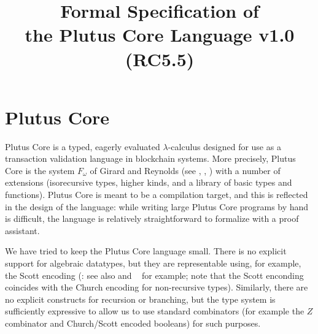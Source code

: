 \documentclass[a4paper]{article}
\begin{document}
%
\title{Formal Specification of\\the Plutus Core Language v1.0 (RC5.5)}


\maketitle

\thispagestyle{plain}
\pagestyle{plain}



\section{Plutus Core}

Plutus Core is a typed, eagerly evaluated $\lambda$-calculus designed
for use as a transaction validation language in blockchain
systems. More precisely, Plutus Core is the system $F_\omega$ of
Girard and Reynolds (see \cite{Girard-thesis},
\cite{Reynolds-type-structure}, \cite[\S30]{Pierce:TAPL}) with a
number of extensions (isorecursive types, higher kinds, and a library
of basic types and functions).  Plutus Core is meant to be a
compilation target, and this is reflected in the design of the
language: while writing large Plutus Core programs by hand is
difficult, the language is relatively straightforward to formalize
with a proof assistant.

We have tried to keep the Plutus Core language small. There is no
explicit support for algebraic datatypes, but they are representable
using, for example, the Scott encoding (\cite{Scott-encoding}: see
also \cite{Koopman:2014} and ~\cite{Geuvers-2014} for example; note that
the Scott enconding coincides with the Church encoding for
non-recursive types). Similarly, there are no explicit constructs for
recursion or branching, but the type system is sufficiently expressive
to allow us to use standard combinators (for example the $Z$
combinator and Church/Scott encoded booleans) for such purposes.
\end{document}
